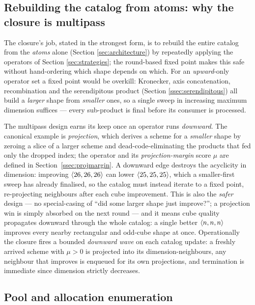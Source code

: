 \subsection{Rebuilding the catalog from atoms: why the closure is multipass}
\label{ssec:multipass}

The closure's job, stated in the strongest form, is to rebuild the entire
catalog from the \emph{atoms} alone (Section \ref{sec:architecture}) by
repeatedly applying the operators of Section \ref{sec:strategies}; the
round-based fixed point makes this safe without hand-ordering which shape
depends on which. For an \emph{upward}-only operator set a fixed point
would be overkill: Kronecker, axis concatenation, recombination and the
serendipitous product (Section \ref{ssec:serendipitous}) all build a
\emph{larger} shape from \emph{smaller} ones, so a single sweep in
increasing maximum dimension suffices --- every sub-product is final before
its consumer is processed.

The multipass design earns its keep once an operator runs \emph{downward}.
The canonical example is \emph{projection}, which derives a scheme for a
\emph{smaller} shape by zeroing a slice of a larger scheme and
dead-code-eliminating the products that fed only the dropped index; the
operator and its \emph{projection-margin} score \(\mu\) are defined in
Section~\ref{ssec:projmargin}. A downward edge destroys the acyclicity in
dimension: improving \(\langle 26, 26, 26 \rangle\) can lower
\(\langle 25, 25, 25 \rangle\), which a smaller-first sweep has already
finalised, so the catalog must instead iterate to a fixed point,
re-projecting neighbours after each cube improvement. This is also the
\emph{safer} design --- no special-casing of ``did some larger shape just
improve?''; a projection win is simply absorbed on the next round --- and
it means cube quality propagates downward through the whole catalog: a
single better \(\langle n, n, n \rangle\) improves every nearby rectangular and
odd-cube shape at once. Operationally the closure fires a bounded
\emph{downward wave} on each catalog update: a freshly arrived scheme with
\(\mu>0\) is projected into its dimension-neighbours, any neighbour that
improves is enqueued for its own projections, and termination is immediate
since dimension strictly decreases.

\subsection{Pool and allocation enumeration}

